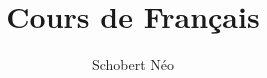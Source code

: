 \documentclass[a4paper, 11pt, hidelinks]{article}
\begin{document}
\title{Cours de Français}
\author{Schobert Néo}

\maketitle

\tableofcontents


\newpage 
\end{document}

